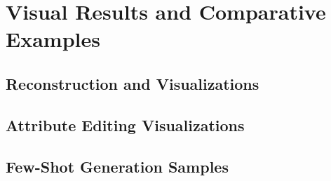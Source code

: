 \section{Visual Results and Comparative Examples}

\subsection{Reconstruction and Visualizations}


\subsection{Attribute Editing Visualizations}


\subsection{Few-Shot Generation Samples}

